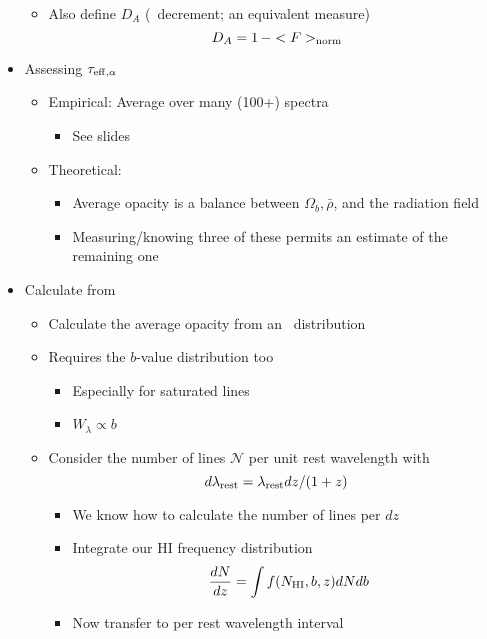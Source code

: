 \documentclass[12pt,letterpaper]{article}
\begin{document}
\begin{Aenumerate}
\begin{itemize}
\begin{itemize}
		\item Also define $D_A$ (\lya\ decrement; an equivalent measure)
		\begin{equation}
		D_A = 1 \, - <F>_{\rm norm}
		\end{equation}
		\end{itemize}
	\item Assessing $\tau_{\rm eff, \alpha}$ 
		\begin{itemize}
		\item Empirical:  Average over many (100+) spectra
			\begin{itemize}
			\item See slides
			\end{itemize}
		\item Theoretical:
			\begin{itemize}
			\item Average opacity is a balance between 
			$\Omega_b, \bar\rho$, and the radiation field
			\item Measuring/knowing three of these permits an estimate of the 
			remaining one
			\end{itemize}
		\end{itemize}
	\item Calculate from \fnhi\ 
		\begin{itemize}
		\item Calculate the average opacity from an \nhi\ distribution
		\item Requires the $b$-value distribution too
			\begin{itemize}
			\item Especially for saturated lines
			\item $W_\lambda \propto b$
			\end{itemize}
		\item Consider the number of lines $\mathcal{N}$ per unit rest wavelength 
		with
		\begin{equation}
		d\lambda_{\rm rest} = \lambda_{\rm rest} dz / (1+z)
		\end{equation}
			\begin{itemize}
			\item We know how to calculate the number of lines per $dz$
			\item Integrate our HI frequency distribution
		  	\begin{equation}
		  	\frac{dN}{dz} = \int f(N_{\rm HI},b,z) dN db  
	  		\end{equation}
			\item Now transfer to per rest wavelength interval

\end{itemize}
\end{itemize}
\end{itemize}
\end{Aenumerate}
\end{document}
